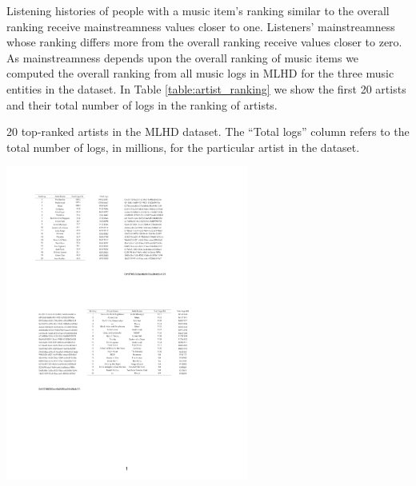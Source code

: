Listening histories of people with a music item's ranking similar to the overall ranking receive mainstreamness values closer to one. Listeners' mainstreamness whose ranking differs more from the overall ranking receive values closer to zero.
As mainstreamness depends upon the overall ranking of music items we computed the overall ranking from all music logs in MLHD for the three music entities in the dataset. In Table \ref{table:artist_ranking} we show the first 20 artists and their total number of logs in the ranking of artists. 

\graphicspath{{./figs/ch6/}}
\begin{table}[!h]
\centering
\caption[20 top-ranked artists in the MLHD dataset]{20 top-ranked artists in the MLHD dataset. The ``Total logs'' column refers to the total number of logs, in millions, for the particular artist in the dataset.}\label{table:artist_ranking}
\includegraphics[width = 0.60\textwidth]{ranking_artist_cropped.pdf}

\end{table}

